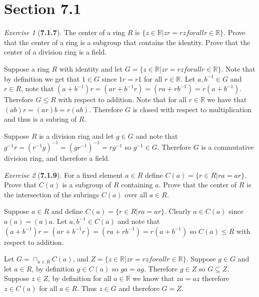 \documentclass[12pt]{amsart}
\makeatletter
\theoremstyle{remark}
\newtheorem*{exercise}{Exercise}%
\def\RR{\ensuremath{\mathbb R}} %
\renewenvironment{proof}[1][\proofname]{\par\doublespacing
  \pushQED{\qed}%
  \normalfont \topsep6\p@\@plus6\p@\relax
  \list{}{%
    \settowidth{\leftmargin}{\itshape\proofname:\hskip\labelsep}%
    \setlength{\labelwidth}{0pt}%
    \setlength{\itemindent}{-\leftmargin}%
  }%
  \item[\hskip\labelsep\itshape#1\@addpunct{:}]\ignorespaces
}{%
  \popQED\endlist\@endpefalse
  \singlespacing
}
\theoremstyle{mycomment}
\makeatother
\begin{document}
\thispagestyle{fancy}
\author{Coordinator: Coordinator's Name}









\section*{\textbf{Section 7.1}}

\begin{exercise}[\textbf{7.1.7}] The center of a ring $R$ is $\{z \in \RR| zr = rz for all r \in \RR\}$. Prove that 
  the center of a ring is a subgroup that contains the identity. Prove that the center of a division ring is a field. 
  \begin{proof} Suppose a ring $R$ with identity and let $G = \{z \in \RR| zr = rz for all r \in \RR\}$. Note that by definition we get that 
    $1 \in G$ since $1r = r1$ for all $r \in \RR$. Let $a, b^{-1} \in G$ and $r \in R$, note that
    $(a + b^{-1})r = (ar + b^{-1}r) = (ra + rb^{-1}) = r(a + b^{-1})$. Therefore $G \leq R$ with respect to 
    addition. Note that for all $r \in \RR$ we have that $(ab)r = (ar)b = r(ab)$. Therefore $G$ is closed with respect to multiplication 
    and thus is a subring of $R$. 

    Suppose $R$ is a division ring and let $g \in G$ and note that $g^{-1}r = (r^{-1}g)^{-1} = (gr^{-1})^{-1} = rg^{-1}$
    so $g^{-1} \in G$. Therefore $G$ is a commutative division ring, and therefore a field. 
  \end{proof}
\end{exercise}
\vspace{.15in}


\begin{exercise}[\textbf{7.1.9}] For a fixed element $a \in R$ define $C(a) = \{r \in R| ra = ar\}$. Prove that $C(a)$
  is a subgroup of $R$ containing $a$. Prove that the center of $R$ is the intersection of the subrings $C(a)$ over all $a \in R$.
  \begin{proof} Suppose $a \in R$ and define $C(a) = \{r \in R| ra = ar\}$. Clearly $a \in C(a)$ since $a(a) = (a)a$. Let 
    $a, b^{-1} \in C(a)$ and note that $(a + b^{-1})r = (ar + b^{-1}r) = (ra + rb^{-1}) = r(a + b^{-1})$ so $C(a) \leq R$ with respect to 
    addition. 

    Let $G = \cap_{a \in R} C(a)$, and $Z =\{z \in \RR| zr = rz for all r \in \RR\}$. Suppose $g \in G$ and let $a \in R$, by definition 
    $g \in C(a)$ so $ga = ag$. Therefore $g \in Z$ so $G \subseteq Z$. Suppose $z \in Z$, by definition for all $a \in \RR$
    we know that $za = az$ therefore $z \in C(a)$ for all $a \in R$. Thus $z \in G$ and therefore $G = Z$. 
  \end{proof}
\end{exercise}
\vspace{.15in}
\end{document}
